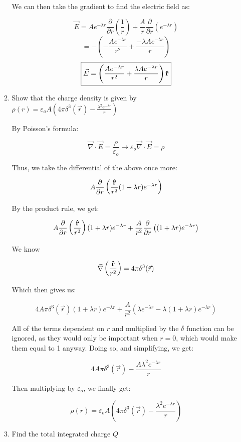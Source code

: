 \begin{enumerate}
\begin{enumerate}
        We can then take the gradient to find the electric field as:

        $$\vec{E}=Ae^{-\lambda r}\frac{\partial}{\partial r}\left( \frac{1}{r} \right)+\frac{A}{r}\frac{\partial}{\partial r}\left( e^{-\lambda r}\right)$$
      $$=-\left( -\frac{Ae^{-\lambda r}}{r^2}+\frac{-\lambda Ae^{-\lambda r}}{r}\right)$$
      $$\boxed{\vec{E}=\left(\frac{Ae^{-\lambda r}}{r^2}+\frac{\lambda Ae^{-\lambda r}}{r}\right)\bold{\hat{r}}}$$

      \item Show that the charge density is given by $\rho(r)=\varepsilon_oA\left( 4\pi\delta^3(\vec{r})-\frac{\lambda^2e^{-\lambda r}}{r} \right)$

        By Poisson's formula:

        $$\vec{\nabla}\cdot\vec{E}=\frac{\rho}{\varepsilon_o}\rightarrow\varepsilon_o\vec{\nabla}\cdot\vec{E}=\rho$$

        Thus, we take the differential of the above once more:

        $$A\frac{\partial}{\partial r}\left( \frac{\bold{\hat{r}}}{r^2}(1+\lambda r)e^{-\lambda r}\right)$$

        By the product rule, we get:

      $$A\frac{\partial}{\partial r}\left( \frac{\bold{\hat{r}}}{r^2}\right)(1+\lambda r)e^{-\lambda r}+\frac{A}{r^2}\frac{\partial}{\partial r}\left((1+\lambda r)e^{-\lambda r}\right)$$

      We know 

      $$\vec{\nabla}\left(\frac{\bold{\hat{r}}}{r^2}\right)=4\pi\delta^3(\vec{r})$$

      Which then gives us:

      $$4A\pi\delta^3(\vec{r})(1+\lambda r)e^{-\lambda r}+\frac{A}{r^2}\left(\lambda e^{-\lambda r}-\lambda(1+\lambda r)e^{-\lambda r}\right)$$

      All of the terms dependent on $r$ and multiplied by the $\delta$ function can be ignored, as they would only be important when $r=0$, which would make them equal to 1 anyway. Doing so, and simplifying, we get:

      $$4A\pi\delta^3(\vec{r})-\frac{A\lambda^2e^{-\lambda r}}{r}$$

      Then multiplying by $\varepsilon_o$, we finally get:

      $$\boxed{\rho(r)=\varepsilon_oA\left( 4\pi\delta^3(\vec{r})-\frac{\lambda^2e^{-\lambda r}}{r} \right)}$$

      \item Find the total integrated charge $Q$


\end{enumerate}
\end{enumerate}
